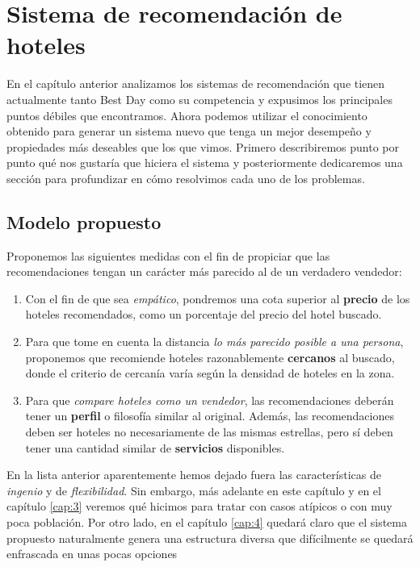 \documentclass[12pt]{report}
\begin{document}
\chapter{Sistema de recomendación de hoteles} \label{cap:2}

En el capítulo anterior analizamos los sistemas de recomendación que tienen actualmente tanto Best Day como su competencia y expusimos los principales puntos débiles que encontramos. Ahora podemos utilizar el conocimiento obtenido para generar un sistema nuevo que tenga un mejor desempeño y propiedades más deseables que los que vimos. Primero describiremos punto por punto qué nos gustaría que hiciera el sistema y posteriormente dedicaremos una sección para profundizar en cómo resolvimos cada uno de los problemas.

\section{Modelo propuesto}

Proponemos las siguientes medidas con el fin de propiciar que las recomendaciones tengan un carácter más parecido al de un verdadero vendedor:
\begin{enumerate}
	\item Con el fin de que sea \emph{empático}, pondremos una cota superior al \textbf{precio} de los hoteles recomendados, como un porcentaje del precio del hotel buscado.
	\item Para que tome en cuenta la distancia \emph{lo más parecido posible a una persona}, proponemos que recomiende hoteles razonablemente \textbf{cercanos} al buscado, donde el criterio de cercanía varía según la densidad de hoteles en la zona.
	\item Para que \emph{compare hoteles como un vendedor}, las recomendaciones deberán tener un \textbf{perfil} o filosofía similar al original. Además, las recomendaciones deben ser hoteles no necesariamente de las mismas estrellas, pero sí deben tener una cantidad similar de \textbf{servicios} disponibles.
\end{enumerate}
En la lista anterior aparentemente hemos dejado fuera las características de \emph{ingenio} y de \emph{flexibilidad}. Sin embargo, más adelante en este capítulo y en el capítulo \ref{cap:3} veremos qué hicimos para tratar con casos atípicos o con muy poca población. Por otro lado, en el capítulo \ref{cap:4} quedará claro que el sistema propuesto naturalmente genera una estructura diversa que difícilmente se quedará enfrascada en unas pocas opciones
\end{document}
